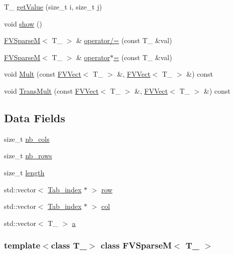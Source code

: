 \begin{DoxyCompactItemize}
T\_\- \hyperlink{classFVSparseM_a89d9927485d8a33c508e8caf871ca117}{getValue} (size\_\-t i, size\_\-t j)
\item 
void \hyperlink{classFVSparseM_a4b148f40a95444d5669406b918ad2f52}{show} ()
\item 
\hyperlink{classFVSparseM}{FVSparseM}$<$ T\_\- $>$ \& \hyperlink{classFVSparseM_af82b4e06becaf94b9a98c445a0bcd2f8}{operator/=} (const T\_\- \&val)
\item 
\hyperlink{classFVSparseM}{FVSparseM}$<$ T\_\- $>$ \& \hyperlink{classFVSparseM_ab7ff4e84f06afbf9b1190381e4fabde2}{operator$\ast$=} (const T\_\- \&val)
\item 
void \hyperlink{classFVSparseM_aa8b4d864372618ec7e35dc7be2dc59ef}{Mult} (const \hyperlink{classFVVect}{FVVect}$<$ T\_\- $>$ \&, \hyperlink{classFVVect}{FVVect}$<$ T\_\- $>$ \&) const 
\item 
void \hyperlink{classFVSparseM_a18ce25ba57af55caad2dac42ae0ca2aa}{TransMult} (const \hyperlink{classFVVect}{FVVect}$<$ T\_\- $>$ \&, \hyperlink{classFVVect}{FVVect}$<$ T\_\- $>$ \&) const 
\end{DoxyCompactItemize}
\subsection*{Data Fields}
\begin{DoxyCompactItemize}
\item 
size\_\-t \hyperlink{classFVSparseM_a4451904bc3a87b7e94ba9967cfe5acc9}{nb\_\-cols}
\item 
size\_\-t \hyperlink{classFVSparseM_a660778a5412448cf6b641e67d1d70011}{nb\_\-rows}
\item 
size\_\-t \hyperlink{classFVSparseM_ae809d5359ac030c60a30a8f0b2294b82}{length}
\item 
std::vector$<$ \hyperlink{FVSparseM_8h_a75e12c6bf84f6847b73ab5ab713bf39c}{Tab\_\-index} $\ast$ $>$ \hyperlink{classFVSparseM_ad5e348a06667f83ce7654e382e90ce57}{row}
\item 
std::vector$<$ \hyperlink{FVSparseM_8h_a75e12c6bf84f6847b73ab5ab713bf39c}{Tab\_\-index} $\ast$ $>$ \hyperlink{classFVSparseM_a075a80b2189de3b24e0c89b98cf4ddb9}{col}
\item 
std::vector$<$ T\_\- $>$ \hyperlink{classFVSparseM_aba6347ed10b77e06dd559a865724cfa6}{a}
\end{DoxyCompactItemize}
\subsubsection*{template$<$class T\_\-$>$ class FVSparseM$<$ T\_\- $>$}



